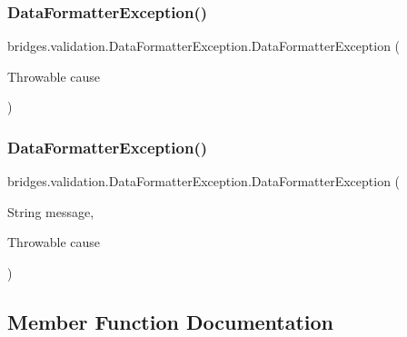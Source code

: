 \hypertarget{classbridges_1_1validation_1_1_data_formatter_exception_ae7ce6479c3caf8077d5e34b79fe980dd}{}\label{classbridges_1_1validation_1_1_data_formatter_exception_ae7ce6479c3caf8077d5e34b79fe980dd} 
\subsubsection{\texorpdfstring{Data\+Formatter\+Exception()}{DataFormatterException()}\hspace{0.1cm}{\footnotesize\ttfamily [3/4]}}
{\footnotesize\ttfamily bridges.\+validation.\+Data\+Formatter\+Exception.\+Data\+Formatter\+Exception (\begin{DoxyParamCaption}\item[{Throwable}]{cause }\end{DoxyParamCaption})}

\hypertarget{classbridges_1_1validation_1_1_data_formatter_exception_acaec0fe0a826d08481207a3bac21c913}{}\label{classbridges_1_1validation_1_1_data_formatter_exception_acaec0fe0a826d08481207a3bac21c913} 
\subsubsection{\texorpdfstring{Data\+Formatter\+Exception()}{DataFormatterException()}\hspace{0.1cm}{\footnotesize\ttfamily [4/4]}}
{\footnotesize\ttfamily bridges.\+validation.\+Data\+Formatter\+Exception.\+Data\+Formatter\+Exception (\begin{DoxyParamCaption}\item[{String}]{message,  }\item[{Throwable}]{cause }\end{DoxyParamCaption})}



\subsection{Member Function Documentation}
\hypertarget{classbridges_1_1validation_1_1_data_formatter_exception_a6223e92ea95f3050d532997cb115cf2a}{}\label{classbridges_1_1validation_1_1_data_formatter_exception_a6223e92ea95f3050d532997cb115cf2a} 
